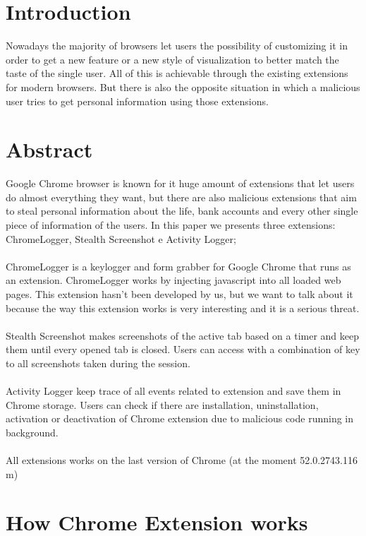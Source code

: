 \documentclass[12pt]{article}
\begin{document}
\begin{multicols}{2}
	\section*{Introduction}
	Nowadays the majority of browsers let users the possibility of customizing it in order to get a new feature or a new style of visualization to better match the taste of the single user.
	All of this is achievable through the existing extensions for modern browsers. But there is also the opposite situation in which a malicious user tries to get personal information using those extensions.
	
	\section*{Abstract}
	Google Chrome browser is known for it huge amount of extensions that let users do almost everything they want, but there are also malicious extensions that aim to steal personal information about the life, bank accounts and every other single piece of information of the users. In this paper we presents three extensions: ChromeLogger\cite{ChromeLogger}, Stealth Screenshot e Activity Logger;\\ \\
	ChromeLogger is a keylogger and form grabber for Google Chrome that runs as an extension.	
	ChromeLogger works by injecting javascript into all loaded web pages. This extension hasn't been developed by us, but we want to talk about it because the way this extension works is very interesting and it is a serious threat.\\ \\
	Stealth Screenshot makes screenshots of the active tab based on a timer and keep them until every opened tab is closed. Users can access with a combination of key to all screenshots taken during the session. \\ \\
	Activity Logger keep trace of all events related to extension and save them in Chrome storage. Users can check if there are installation, uninstallation, activation or deactivation of Chrome extension due to malicious code running in background.\\ \\
	All extensions works on the last version of Chrome (at the moment 52.0.2743.116 m)
\section*{How Chrome Extension works}

\end{multicols}
\end{document}
